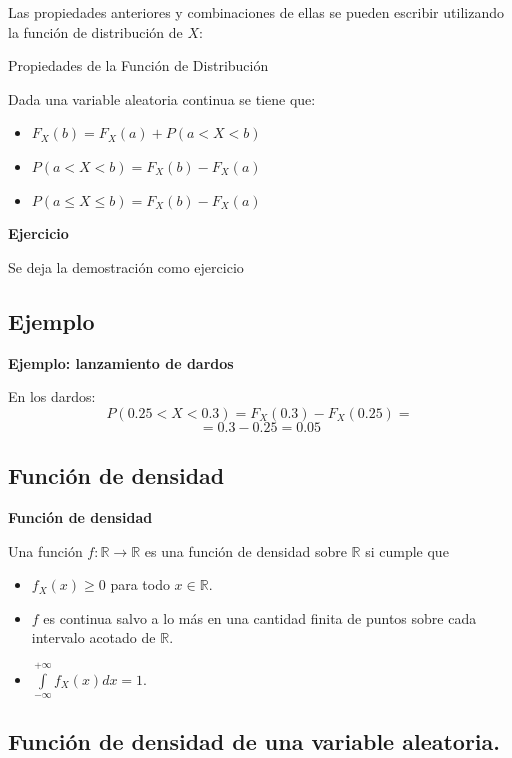 \documentclass[]{book}
\providecommand{\tightlist}{%
  \setlength{\itemsep}{0pt}\setlength{\parskip}{0pt}}
\begin{document}
Las propiedades anteriores y combinaciones de ellas se pueden
escribir utilizando la función de distribución de \(X\):

 Propiedades de la Función de Distribución

Dada una variable aleatoria continua se tiene que:

\begin{itemize}
\tightlist
\item
  \(F_{X}(b)=F_{X}(a)+P(a<X<b)\)
\item
  \(P(a<X<b)=F_{X}(b)-F_{X}(a)\)
\item
  \(P(a\leq X\leq b)=F_{X}(b)-F_{X}(a)\)
\end{itemize}

\textbf{Ejercicio}

Se deja la demostración como ejercicio

\hypertarget{ejemplo-20}{%
\subsection{Ejemplo}\label{ejemplo-20}}

\textbf{Ejemplo: lanzamiento de dardos}

En los dardos:
\[P(0.25<X<0.3)=F_{X}(0.3)-F_{X}(0.25)=\]
\[=0.3-0.25=0.05\]

\hypertarget{funciuxf3n-de-densidad}{%
\subsection{Función de densidad}\label{funciuxf3n-de-densidad}}

 \textbf{Función de densidad}

Una función \(f:\mathbb{R}\to\mathbb{R}\) es una función de densidad sobre \(\mathbb{R}\) si cumple que

\begin{itemize}
\tightlist
\item
  \(f_{X}(x)\geq 0\) para todo \(x \in\mathbb{R}.\)
\item
  \(f\) es continua salvo a lo más en una cantidad finita de puntos sobre
  cada intervalo acotado de \(\mathbb{R}\).
\item
  \(\displaystyle\int\limits_{-\infty}^{+\infty} f_{X}(x) dx=1.\)
\end{itemize}

\hypertarget{funciuxf3n-de-densidad-de-una-variable-aleatoria.}{%
\subsection{Función de densidad de una variable aleatoria.}\label{funciuxf3n-de-densidad-de-una-variable-aleatoria.}}
\end{document}
